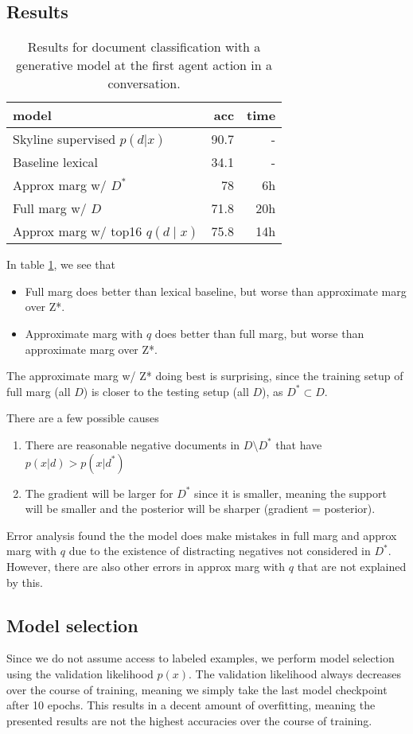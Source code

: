 \documentclass[11pt]{article}
\begin{document}
\subsection{Results}

\begin{table}
\centering
\begin{tabular}{lrr}
\toprule
model & acc & time\\
\midrule
Skyline supervised $p(d|x)$ & 90.7 & -\\
Baseline lexical & 34.1 & -\\
Approx marg w/ $D^*$ & 78 & 6h\\
Full marg w/ $D$ & 71.8 & 20h\\
Approx marg w/ top16 $q(d\mid x)$ & 75.8 & 14h\\
\bottomrule
\end{tabular}
\caption{
\label{tbl:unsup-doc-app}
Results for document classification with a generative model at the first
agent action in a conversation.}
\end{table}

In table \ref{tbl:unsup-doc-app}, we see that
\begin{itemize}
\item Full marg does better than lexical baseline, but worse than approximate marg over Z*.
\item Approximate marg with $q$ does better than full marg, but worse than approximate marg over Z*.
\end{itemize}
The approximate marg w/ Z* doing best is surprising,
since the training setup of full marg (all $D$) is closer to the testing setup (all $D$),
as $D^*\subset D$.

There are a few possible causes
\begin{enumerate}
\item There are reasonable negative documents in $D \setminus D^*$ that have $p(x|d) > p(x|d^*)$
\item The gradient will be larger for $D^*$ since it is smaller, meaning the support will be smaller
    and the posterior will be sharper (gradient = posterior).
\end{enumerate}
Error analysis found the the model does make mistakes in full marg and approx marg with $q$
due to the existence of distracting negatives not considered in $D^*$.
However, there are also other errors in approx marg with $q$ that are not explained by this.

\subsection{Model selection}
Since we do not assume access to labeled examples, we perform model selection using the
validation likelihood $p(x)$.
The validation likelihood always decreases over the course of training,
meaning we simply take the last model checkpoint after 10 epochs.
This results in a decent amount of overfitting, meaning the presented results are not the
highest accuracies over the course of training.
\end{document}
